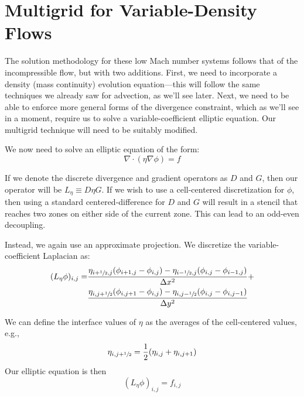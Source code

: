 \section{Multigrid for Variable-Density Flows}

The solution methodology for these low Mach number systems follows 
that of the incompressible flow, but with two additions.  First,
we need to incorporate a density (mass continuity) evolution equation---this
will follow the same techniques we already saw for advection, as we'll
see later.
Next, we need to be able to enforce more general forms of the 
divergence constraint, which as we'll see in a moment, require
us to solve a variable-coefficient elliptic equation.  Our
multigrid technique will need to be suitably modified.

\label{sec:lm:vcelliptic}

We now need to solve an elliptic equation of the form:
\begin{equation}
\nabla \cdot (\eta \nabla \phi) = f
\end{equation}

If we denote the discrete divergence and gradient operators as $D$ and $G$,
then our operator will be $L_\eta \equiv D \eta G$.  If we wish to
use a cell-centered discretization for $\phi$, then using a standard 
centered-difference for $D$ and $G$ will result in a stencil that reaches
two zones on either side of the current zone.  This can lead to an
odd-even decoupling. 


Instead, we again use an approximate projection.  We discretize the
variable-coefficient Laplacian as:
\begin{align}
(L_\eta \phi)_{i,j} = 
 & \frac{\eta_{i+{\sfrac{1}{2}},j} (\phi_{i+1,j} - \phi_{i,j}) -
        \eta_{i-{\sfrac{1}{2}},j} (\phi_{i,j} - \phi_{i-1,j})}{\Delta x^2} + \nonumber \\
 & \frac{\eta_{i,j+{\sfrac{1}{2}}} (\phi_{i,j+1} - \phi_{i,j}) -
        \eta_{i,j-{\sfrac{1}{2}}} (\phi_{i,j} - \phi_{i,j-1})}{\Delta y^2}
\label{lm:eq:lap}
\end{align}

We can define the interface values of $\eta$ as the averages of the
cell-centered values, e.g.,
\begin{equation}
  \eta_{i,j+{\sfrac{1}{2}}} = \frac{1}{2}(\eta_{i,j} + \eta_{i,j+1})
\end{equation}
Our elliptic equation is then 
\begin{equation}
(L_\eta \phi)_{i,j} = f_{i,j}
\end{equation}

